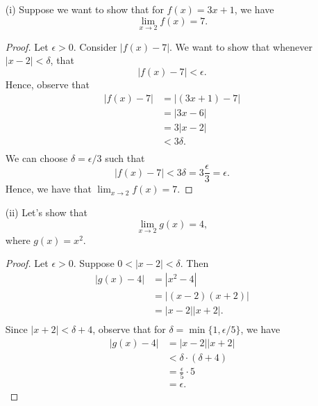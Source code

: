 \begin{ex}
\begin{enumerate}
    \item[(i)] Suppose we want to show that for \( f(x) = 3x + 1  \), we have 
        \[ \lim_{ x \to 2 } f(x) = 7. \]
        \begin{proof}
        Let \( \epsilon > 0  \). Consider \( | f(x) - 7  |  \). We want to show that whenever \( | x - 2  | < \delta \), that 
        \[  | f(x) - 7 | < \epsilon. \]
        Hence, observe that 
        \begin{align*}
            | f(x) - 7  | &= | (3x+1) - 7  |  \\
                          &= | 3x - 6  |  \\
                          &= 3| x - 2 | \\ 
                          &< 3 \delta. \\
        \end{align*}
        We can choose \( \delta = \epsilon / 3  \) such that 
        \[  | f(x) - 7  | < 3 \delta = 3 \frac{ \epsilon  }{ 3 } = \epsilon. \]
        Hence, we have that \( \lim_{ x \to 2 } f(x) = 7. \)
        \end{proof}
    \item[(ii)] Let's show that 
        \[  \lim_{ x \to 2  } g(x) = 4, \]
        where \( g(x) = x^2  \).
        \begin{proof}
        Let \( \epsilon > 0  \). Suppose \( 0 < | x - 2  | < \delta  \). Then 
        \begin{align*}
            | g(x) - 4  | &= | x^2 - 4  |  \\
                          &= | (x-2)(x+2) | \\
                          &= | x-2 | | x+2 |.\\
        \end{align*}
        Since \( |x + 2 | < \delta + 4   \), observe that for \( \delta = \min \{1, \epsilon / 5\}  \), we have 
        \begin{align*}
           | g(x) - 4  |  &= | x-2 | | x+2 |  \\
                          &< \delta \cdot (\delta + 4 ) \\
                          &= \frac{ \epsilon  }{ 5 } \cdot 5 \\
                          &= \epsilon.
        \end{align*}
        \end{proof}
\end{enumerate}
\end{ex}

